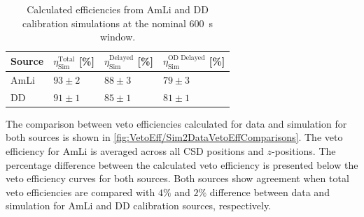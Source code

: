 \renewcommand{\arraystretch}{1.5}
\begin{table}[h!]
    \centering
    \caption[Calculated efficiencies from AmLi and DD calibration simulations at the nominal 600~\textmu s window.]{Calculated efficiencies from AmLi and DD calibration simulations at the nominal 600~\textmu s window.}
    \begin{tabular}{llll}
    \hline\hline
    \textbf{Source} & \textbf{$\eta^\text{Total}_\text{Sim}$ [\%]} & \textbf{$\eta^\text{Delayed}_\text{Sim}$ [\%]} & \textbf{$\eta^\text{OD Delayed}_\text{Sim}$ [\%]}\\
    \hline
    AmLi & $93\pm2$ & $88\pm3$ & $79\pm3$ \\
    DD & $91\pm1$ & $85\pm1$ & $81\pm1$\\
    \hline\hline
    \end{tabular}
    \label{tab:VetoEff/CalibrationSimulationEfficiencies}
\end{table}
\renewcommand{\arraystretch}{1}

The comparison between veto efficiencies calculated for data and simulation for both sources is shown in \autoref{fig:VetoEff/Sim2DataVetoEffComparisons}. The veto efficiency for AmLi is averaged across all CSD positions and $z$-positions. The percentage difference between the calculated veto efficiency is presented below the veto efficiency curves for both sources. Both sources show agreement when total veto efficiencies are compared with $4\%$ and $2\%$ difference between data and simulation for AmLi and DD calibration sources, respectively.


